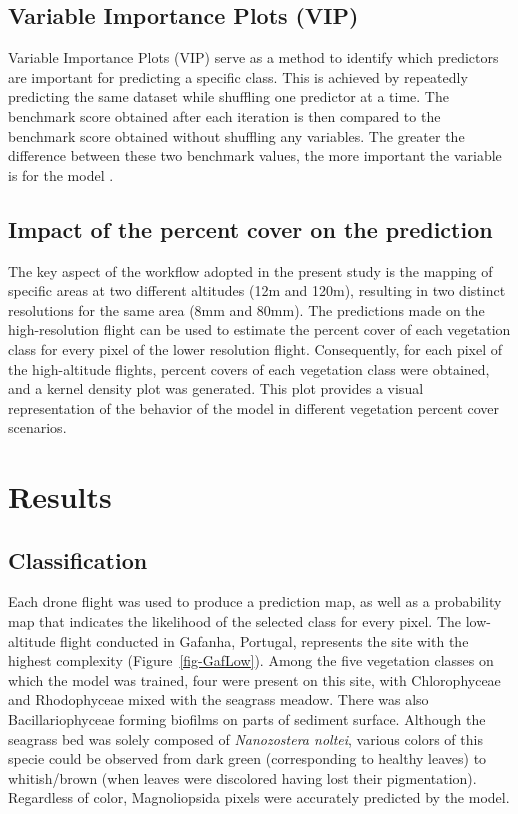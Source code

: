 \documentclass[
  number]{elsarticle}
\begin{document}
\subsection{Variable Importance Plots
(VIP)}\label{variable-importance-plots-vip}

Variable Importance Plots (VIP) serve as a method to identify which
predictors are important for predicting a specific class. This is
achieved by repeatedly predicting the same dataset while shuffling one
predictor at a time. The benchmark score obtained after each iteration
is then compared to the benchmark score obtained without shuffling any
variables. The greater the difference between these two benchmark
values, the more important the variable is for the model
\citep{WEI2015399}.

\subsection{Impact of the percent cover on the
prediction}\label{impact-of-the-percent-cover-on-the-prediction}

The key aspect of the workflow adopted in the present study is the
mapping of specific areas at two different altitudes (12m and 120m),
resulting in two distinct resolutions for the same area (8mm and 80mm).
The predictions made on the high-resolution flight can be used to
estimate the percent cover of each vegetation class for every pixel of
the lower resolution flight. Consequently, for each pixel of the
high-altitude flights, percent covers of each vegetation class were
obtained, and a kernel density plot was generated. This plot provides a
visual representation of the behavior of the model in different
vegetation percent cover scenarios.

\section{Results}\label{results}

\subsection{Classification}\label{classification}

Each drone flight was used to produce a prediction map, as well as a
probability map that indicates the likelihood of the selected class for
every pixel. The low-altitude flight conducted in Gafanha, Portugal,
represents the site with the highest complexity
(Figure~\ref{fig-GafLow}). Among the five vegetation classes on which
the model was trained, four were present on this site, with
Chlorophyceae and Rhodophyceae mixed with the seagrass meadow. There was
also Bacillariophyceae forming biofilms on parts of sediment surface.
Although the seagrass bed was solely composed of \emph{Nanozostera
noltei}, various colors of this specie could be observed from dark green
(corresponding to healthy leaves) to whitish/brown (when leaves were
discolored having lost their pigmentation). Regardless of color,
Magnoliopsida pixels were accurately predicted by the model.
\end{document}
